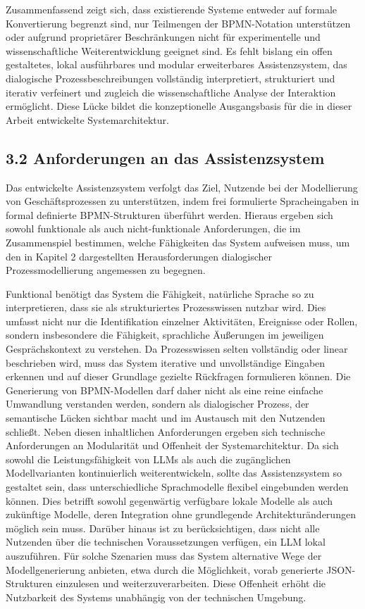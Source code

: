 \documentclass[a4paper,12pt]{scrreprt}
\begin{document}
Zusammenfassend zeigt sich, dass existierende Systeme entweder auf formale Konvertierung begrenzt sind, nur Teilmengen der BPMN-Notation unterstützen oder aufgrund proprietärer Beschränkungen nicht für experimentelle und wissenschaftliche Weiterentwicklung geeignet sind. Es fehlt bislang ein offen gestaltetes, lokal ausführbares und modular erweiterbares Assistenzsystem, das dialogische Prozessbeschreibungen vollständig interpretiert, strukturiert und iterativ verfeinert und zugleich die wissenschaftliche Analyse der Interaktion ermöglicht. Diese Lücke bildet die konzeptionelle Ausgangsbasis für die in dieser Arbeit entwickelte Systemarchitektur.


\subsection*{3.2 Anforderungen an das Assistenzsystem}

Das entwickelte Assistenzsystem verfolgt das Ziel, Nutzende bei der Modellierung von Geschäftsprozessen zu unterstützen, indem frei formulierte Spracheingaben in formal definierte BPMN-Strukturen überführt werden. Hieraus ergeben sich sowohl funktionale als auch nicht-funktionale Anforderungen, die im Zusammenspiel bestimmen, welche Fähigkeiten das System aufweisen muss, um den in Kapitel 2 dargestellten Herausforderungen dialogischer Prozessmodellierung angemessen zu begegnen.

Funktional benötigt das System die Fähigkeit, natürliche Sprache so zu interpretieren, dass sie als strukturiertes Prozesswissen nutzbar wird. Dies umfasst nicht nur die Identifikation einzelner Aktivitäten, Ereignisse oder Rollen, sondern insbesondere die Fähigkeit, sprachliche Äußerungen im jeweiligen Gesprächskontext zu verstehen. Da Prozesswissen selten vollständig oder linear beschrieben wird, muss das System iterative und unvollständige Eingaben erkennen und auf dieser Grundlage gezielte Rückfragen formulieren können. Die Generierung von BPMN-Modellen darf daher nicht als eine reine einfache Umwandlung verstanden werden, sondern als dialogischer Prozess, der semantische Lücken sichtbar macht und im Austausch mit den Nutzenden schließt.
\newline	
Neben diesen inhaltlichen Anforderungen ergeben sich technische Anforderungen an Modularität und Offenheit der Systemarchitektur. Da sich sowohl die Leistungsfähigkeit von LLMs als auch die zugänglichen Modellvarianten kontinuierlich weiterentwickeln, sollte das Assistenzsystem so gestaltet sein, dass unterschiedliche Sprachmodelle flexibel eingebunden werden können. Dies betrifft sowohl gegenwärtig verfügbare lokale Modelle als auch zukünftige Modelle, deren Integration ohne grundlegende Architekturänderungen möglich sein muss. Darüber hinaus ist zu berücksichtigen, dass nicht alle Nutzenden über die technischen Voraussetzungen verfügen, ein LLM lokal auszuführen. Für solche Szenarien muss das System alternative Wege der Modellgenerierung anbieten, etwa durch die Möglichkeit, vorab generierte JSON-Strukturen einzulesen und weiterzuverarbeiten. Diese Offenheit erhöht die Nutzbarkeit des Systems unabhängig von der technischen Umgebung.
\end{document}
